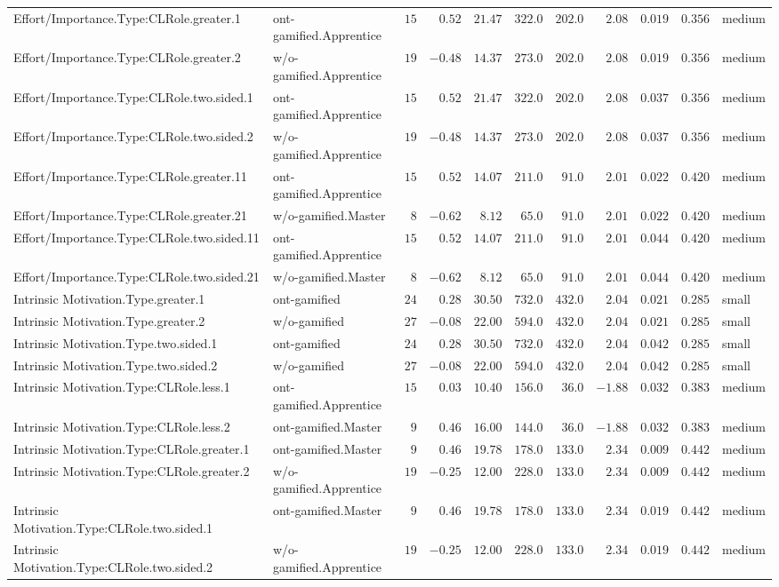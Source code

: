 \documentclass[6pt,a4paper]{article}
\begin{document}
\begin{landscape}
{\begin{longtable}{llrrrrrrrrl}
Effort/Importance.Type:CLRole.greater.1&ont-gamified.Apprentice&$15$&$ 0.52$&$21.47$&$322.0$&$202.0$&$ 2.08$&$0.019$&$0.356$&medium\tabularnewline
Effort/Importance.Type:CLRole.greater.2&w/o-gamified.Apprentice&$19$&$-0.48$&$14.37$&$273.0$&$202.0$&$ 2.08$&$0.019$&$0.356$&medium\tabularnewline
Effort/Importance.Type:CLRole.two.sided.1&ont-gamified.Apprentice&$15$&$ 0.52$&$21.47$&$322.0$&$202.0$&$ 2.08$&$0.037$&$0.356$&medium\tabularnewline
Effort/Importance.Type:CLRole.two.sided.2&w/o-gamified.Apprentice&$19$&$-0.48$&$14.37$&$273.0$&$202.0$&$ 2.08$&$0.037$&$0.356$&medium\tabularnewline
Effort/Importance.Type:CLRole.greater.11&ont-gamified.Apprentice&$15$&$ 0.52$&$14.07$&$211.0$&$ 91.0$&$ 2.01$&$0.022$&$0.420$&medium\tabularnewline
Effort/Importance.Type:CLRole.greater.21&w/o-gamified.Master&$ 8$&$-0.62$&$ 8.12$&$ 65.0$&$ 91.0$&$ 2.01$&$0.022$&$0.420$&medium\tabularnewline
Effort/Importance.Type:CLRole.two.sided.11&ont-gamified.Apprentice&$15$&$ 0.52$&$14.07$&$211.0$&$ 91.0$&$ 2.01$&$0.044$&$0.420$&medium\tabularnewline
Effort/Importance.Type:CLRole.two.sided.21&w/o-gamified.Master&$ 8$&$-0.62$&$ 8.12$&$ 65.0$&$ 91.0$&$ 2.01$&$0.044$&$0.420$&medium\tabularnewline
Intrinsic Motivation.Type.greater.1&ont-gamified&$24$&$ 0.28$&$30.50$&$732.0$&$432.0$&$ 2.04$&$0.021$&$0.285$&small\tabularnewline
Intrinsic Motivation.Type.greater.2&w/o-gamified&$27$&$-0.08$&$22.00$&$594.0$&$432.0$&$ 2.04$&$0.021$&$0.285$&small\tabularnewline
\newpage
Intrinsic Motivation.Type.two.sided.1&ont-gamified&$24$&$ 0.28$&$30.50$&$732.0$&$432.0$&$ 2.04$&$0.042$&$0.285$&small\tabularnewline
Intrinsic Motivation.Type.two.sided.2&w/o-gamified&$27$&$-0.08$&$22.00$&$594.0$&$432.0$&$ 2.04$&$0.042$&$0.285$&small\tabularnewline
Intrinsic Motivation.Type:CLRole.less.1&ont-gamified.Apprentice&$15$&$ 0.03$&$10.40$&$156.0$&$ 36.0$&$-1.88$&$0.032$&$0.383$&medium\tabularnewline
Intrinsic Motivation.Type:CLRole.less.2&ont-gamified.Master&$ 9$&$ 0.46$&$16.00$&$144.0$&$ 36.0$&$-1.88$&$0.032$&$0.383$&medium\tabularnewline
Intrinsic Motivation.Type:CLRole.greater.1&ont-gamified.Master&$ 9$&$ 0.46$&$19.78$&$178.0$&$133.0$&$ 2.34$&$0.009$&$0.442$&medium\tabularnewline
Intrinsic Motivation.Type:CLRole.greater.2&w/o-gamified.Apprentice&$19$&$-0.25$&$12.00$&$228.0$&$133.0$&$ 2.34$&$0.009$&$0.442$&medium\tabularnewline
Intrinsic Motivation.Type:CLRole.two.sided.1&ont-gamified.Master&$ 9$&$ 0.46$&$19.78$&$178.0$&$133.0$&$ 2.34$&$0.019$&$0.442$&medium\tabularnewline
Intrinsic Motivation.Type:CLRole.two.sided.2&w/o-gamified.Apprentice&$19$&$-0.25$&$12.00$&$228.0$&$133.0$&$ 2.34$&$0.019$&$0.442$&medium\tabularnewline

\end{longtable}}
\end{landscape}
\end{document}
